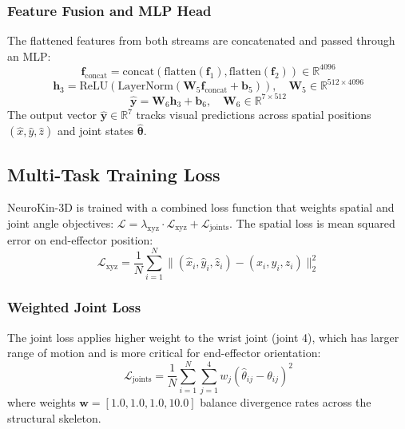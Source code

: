 \documentclass[12pt,a4paper,oneside]{report}
\begin{document}
\subsubsection{Feature Fusion and MLP Head}

The flattened features from both streams are concatenated and passed through an MLP:
\begin{equation}
\mathbf{f}_{\text{concat}} = \text{concat}(\text{flatten}(\mathbf{f}_1), \text{flatten}(\mathbf{f}_2)) \in \mathbb{R}^{4096}
\end{equation}
\begin{equation}
\mathbf{h}_3 = \text{ReLU}(\text{LayerNorm}(\mathbf{W}_5 \mathbf{f}_{\text{concat}} + \mathbf{b}_5)), \quad \mathbf{W}_5 \in \mathbb{R}^{512 \times 4096}
\end{equation}
\begin{equation}
\hat{\mathbf{y}} = \mathbf{W}_6 \mathbf{h}_3 + \mathbf{b}_6, \quad \mathbf{W}_6 \in \mathbb{R}^{7 \times 512}
\end{equation}
The output vector $\hat{\mathbf{y}} \in \mathbb{R}^7$ tracks visual predictions across spatial positions $(\hat{x}, \hat{y}, \hat{z})$ and joint states $\hat{\boldsymbol{\theta}}$.

\subsection{Multi-Task Training Loss}

NeuroKin-3D is trained with a combined loss function that weights spatial and joint angle objectives: $\mathcal{L} = \lambda_{\text{xyz}} \cdot \mathcal{L}_{\text{xyz}} + \mathcal{L}_{\text{joints}}$. The spatial loss is mean squared error on end-effector position:
\begin{equation}
\mathcal{L}_{\text{xyz}} = \frac{1}{N} \sum_{i=1}^{N} \|(\hat{x}_i, \hat{y}_i, \hat{z}_i) - (x_i, y_i, z_i)\|_2^2
\end{equation}

\subsubsection{Weighted Joint Loss}

The joint loss applies higher weight to the wrist joint (joint 4), which has larger range of motion and is more critical for end-effector orientation:
\begin{equation}
\mathcal{L}_{\text{joints}} = \frac{1}{N} \sum_{i=1}^{N} \sum_{j=1}^{4} w_j (\hat{\theta}_{ij} - \theta_{ij})^2
\end{equation}
where weights $\mathbf{w} = [1.0, 1.0, 1.0, 10.0]$ balance divergence rates across the structural skeleton.
\end{document}
